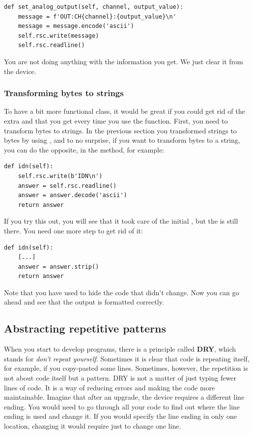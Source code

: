 \begin{verbatim}
def set_analog_output(self, channel, output_value):
    message = f'OUT:CH{channel}:{output_value}\n'
    message = message.encode('ascii')
    self.rsc.write(message)
    self.rsc.readline()
\end{verbatim}

You are not doing anything with the information you get. We just clear it from the device.

\subsubsection{Transforming bytes to strings}
To have a bit more functional class, it would be great if you could get rid of the extra  and \py{\n} that you get every time you use the  function. First, you need to transform bytes to strings. In the previous section you transformed strings to bytes by using , and to no surprise, if you want to transform bytes to a string, you can do the opposite, in the  method, for example:

\begin{verbatim}
def idn(self):
    self.rsc.write(b'IDN\n')
    answer = self.rsc.readline()
    answer = answer.decode('ascii')
    return answer
\end{verbatim}

If you try this out, you will see that it took care of the initial , but the \py{\n} is still there. You need one more step to get rid of it:

\begin{verbatim}
def idn(self):
    [...]
    answer = answer.strip()
    return answer
\end{verbatim}

Note that you have used %
\py{[...]} to hide the code that didn't change. Now you can go ahead and see that the output is formatted correctly.


\subsection{Abstracting repetitive patterns}\label{subsec:abstracting-repetitive-patterns}
When you start to develop programs, there is a principle called \textbf{DRY}, which stands for \emph{don't repeat yourself}. Sometimes it is clear that code is repeating itself, for example, if you copy-pasted some lines. Sometimes, however, the repetition is not about code itself but a pattern. {DRY} is not a matter of just typing fewer lines of code. It is a way of reducing errors and making the code more maintainable. Imagine that after an upgrade, the device requires a different line ending. You would need to go through all your code to find out where the line ending is used and change it. If you would specify the line ending in only one location, changing it would require just to change one line.


